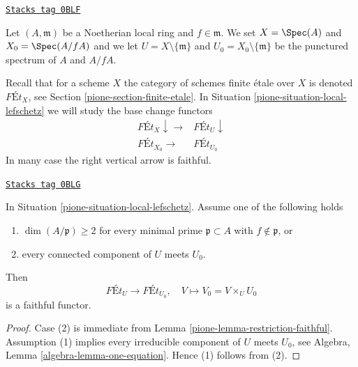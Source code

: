 \begin{definition}
\label{pione-situation-local-lefschetz}
\href{https://stacks.math.columbia.edu/tag/0BLF}{\texttt{Stacks tag 0BLF}}

Let $(A, \mathfrak m)$ be a Noetherian local ring and $f \in \mathfrak m$.
We set $X = \Spec(A)$ and $X_0 = \Spec(A/fA)$ and we
let $U = X \setminus \{\mathfrak m\}$ and
$U_0 = X_0 \setminus \{\mathfrak m\}$ be the punctured spectrum of
$A$ and $A/fA$.
\end{definition}

Recall that for a scheme $X$ the category of schemes finite
\'etale over $X$ is denoted $\textit{F\'Et}_X$, see
Section \ref{pione-section-finite-etale}.
In Situation \ref{pione-situation-local-lefschetz}
we will study the base change functors
$$
\begin{array}{cc}\textit{F\'Et}_X \downarrow\longrightarrow & \textit{F\'Et}_U \downarrow \\ \textit{F\'Et}_{X_0} \longrightarrow & \textit{F\'Et}_{U_0}\end{array}
$$
In many case the right vertical arrow is faithful.

\begin{lemma}[Faithful]
\label{pione-lemma-faithful}
\href{https://stacks.math.columbia.edu/tag/0BLG}{\texttt{Stacks tag 0BLG}}

In Situation \ref{pione-situation-local-lefschetz}.
Assume one of the following holds
\begin{enumerate}
\item $\dim(A/\mathfrak p) \geq 2$ for every minimal prime
$\mathfrak p \subset A$ with $f \not \in \mathfrak p$, or
\item every connected component of $U$ meets $U_0$.
\end{enumerate}
Then
$$
\textit{F\'Et}_U \longrightarrow \textit{F\'Et}_{U_0},\quad
V \longmapsto V_0 = V \times_U U_0
$$
is a faithful functor.
\end{lemma}

\begin{proof}

Case (2) is immediate from Lemma \ref{pione-lemma-restriction-faithful}.
Assumption (1) implies every irreducible component of $U$ meets $U_0$, see
Algebra, Lemma \ref{algebra-lemma-one-equation}.
Hence (1) follows from (2).
\end{proof}

